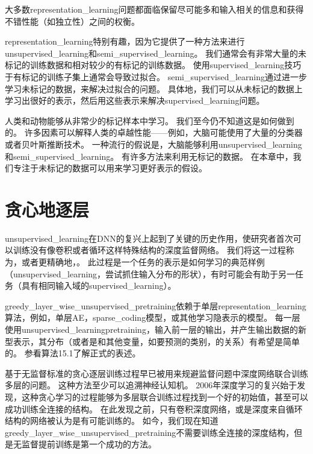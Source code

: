 大多数\gls{representation_learning}问题都面临保留尽可能多和输入相关的信息和获得不错性能（如独立性）之间的权衡。


\gls{representation_learning}特别有趣，因为它提供了一种方法来进行\gls{unsupervised_learning}和\gls{semi_supervised_learning}。
我们通常会有非常大量的未标记的训练数据和相对较少的有标记的训练数据。
使用\gls{supervised_learning}技巧于有标记的训练子集上通常会导致过拟合。
\gls{semi_supervised_learning}通过进一步学习未标记的数据，来解决过拟合的问题。
具体地，我们可以从未标记的数据上学习出很好的表示，然后用这些表示来解决\gls{supervised_learning}问题。


人类和动物能够从非常少的标记样本中学习。
我们至今仍不知道这是如何做到的。
许多因素可以解释人类的卓越性能——例如，大脑可能使用了大量的分类器或者贝叶斯推断技术。
一种流行的假说是，大脑能够利用\gls{unsupervised_learning}和\gls{semi_supervised_learning}。
有许多方法来利用无标记的数据。
在本章中，我们专注于未标记的数据可以用来学习更好表示的假设。


\section{贪心地逐层}
\label{sec:greedy_layer_wise_unsupervised_pretraining}
\gls{unsupervised_learning}在\gls{DNN}的复兴上起到了关键的历史作用，使研究者首次可以训练没有像卷积或者循环这样特殊结构的深度监督网络。
我们将这一过程称为，或者更精确地，。
此过程是一个任务的表示是如何学习的典范样例（\gls{unsupervised_learning}，尝试抓住输入分布的形状），有时可能会有助于另一任务（具有相同输入域的\gls{supervised_learning}）。


\gls{greedy_layer_wise_unsupervised_pretraining}依赖于单层\gls{representation_learning}算法，例如，单层\gls{AE}，\gls{sparse_coding}模型，或其他学习隐表示的模型。
每一层使用\gls{unsupervised_learning}\gls{pretraining}，输入前一层的输出，并产生输出数据的新型表示，其分布（或者是和其他变量，如要预测的类别，的关系）有希望是简单的。
参看算法15.1了解正式的表述。


基于无监督标准的贪心逐层训练过程早已被用来规避监督问题中深度网络联合训练多层的问题。
这种方法至少可以追溯神经认知机\citep{Fukushima75}。
2006年深度学习的复兴始于发现，这种贪心学习的过程能够为多层联合训练过程找到一个好的初始值，甚至可以成功训练全连接的结构\citep{Hinton06-small,Hinton-Science2006,HintonG2006,Bengio-nips-2006,ranzato-07-small}。
在此发现之前，只有卷积深度网络，或是深度来自循环结构的网络被认为是有可能训练的。
如今，我们现在知道\gls{greedy_layer_wise_unsupervised_pretraining}不需要训练全连接的深度结构，但是无监督提前训练是第一个成功的方法。



